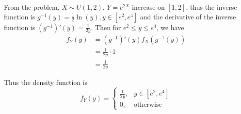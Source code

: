 \documentclass[a4paper, UTF-8]{article}
\theoremstyle{plain}
\begin{document}
From the problem, $X \sim U(1,2)$. $Y = e^{2X}$ increase on $[1, 2]$, thus the inverse function is $g^{-1}(y) = \frac{1}{2} \ln(y), y \in [e^2, e^4]$ and the derivative of the inverse function is $(g^{-1})'(y) = \frac{1}{2y}$. Then for $e^2 \leq y \leq e^4$, we have
\begin{align*}
f_Y(y) &= (g^{-1})'(y) f_X(g^{-1}(y)) \\
&= \frac{1}{2y} \cdot 1 \\
&= \frac{1}{2y}
\end{align*}

Thus the density function is
$$
f_Y(y) = \begin{cases}
\frac{1}{2y}, & y \in [e^2, e^4] \\
0, & \text{otherwise}
\end{cases}
$$
\end{document}

